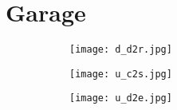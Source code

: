 \section{Garage}
\begin{figure}
	\begin{subfigure}{.3\linewidth}
		\centering
		\texttt{[image: d\_d2r.jpg]}
	\end{subfigure}
	\hfill
	\begin{subfigure}{.3\linewidth}
		\centering
		\texttt{[image: u\_c2s.jpg]}
	\end{subfigure}
	\hfill
	\begin{subfigure}{.3\linewidth}
		\centering
		\texttt{[image: u\_d2e.jpg]}
	\end{subfigure}
\end{figure}